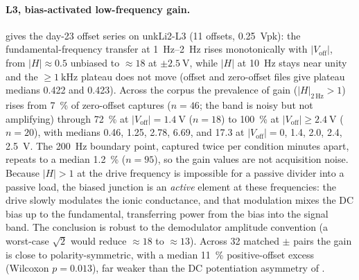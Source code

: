 \paragraph{L3, bias-activated low-frequency gain.}
 gives the day-23 offset series on unkLi2-L3
(\num{11} offsets, \SI{0.25}{Vpk}): the fundamental-frequency transfer at
\SIrange{1}{2}{\hertz} rises monotonically with \(|V_\mathrm{off}|\), from
\(|H|\approx0.5\) unbiased to \(\approx\!18\) at \(\pm\SI{2.5}{\volt}\),
while \(|H|\) at \SI{10}{\hertz} stays near unity and the
\(\geq\!\SI{1}{\kilo\hertz}\) plateau does not move (offset and zero-offset
files give plateau medians \num{0.422} and \num{0.423}). Across the corpus
the prevalence of gain (\(|H|_{2\,\mathrm{Hz}}>1\)) rises from
\SI{7}{\percent} of zero-offset captures (\(n=46\); the band is noisy but
not amplifying) through \SI{72}{\percent} at \(|V_\mathrm{off}|=\SI{1.4}{\volt}\)
(\(n=18\)) to \SI{100}{\percent} at \(|V_\mathrm{off}|\geq\SI{2.4}{\volt}\)
(\(n=20\)), with medians \num{0.46}, \num{1.25}, \num{2.78}, \num{6.69},
and \num{17.3} at \(|V_\mathrm{off}| = 0\), \num{1.4}, \num{2.0}, \num{2.4},
\SI{2.5}{\volt}. The \SI{200}{\hertz} boundary point, captured twice per
condition minutes apart, repeats to a median \SI{1.2}{\percent} (\(n=95\)),
so the gain values are not acquisition noise. Because \(|H|>1\) at the drive
frequency is impossible for a passive divider into a passive load, the biased
junction is an \emph{active} element at these frequencies: the drive slowly
modulates the ionic conductance, and that modulation mixes the DC bias up to
the fundamental, transferring power from the bias into the signal band. The
conclusion is robust to the demodulator amplitude convention (a worst-case
\(\sqrt{2}\) would reduce \(\approx\!18\) to \(\approx\!13\)). Across
\num{32} matched \(\pm\) pairs the gain is close to polarity-symmetric, with
a median \SI{11}{\percent} positive-offset excess (Wilcoxon \(p=0.013\)),
far weaker than the DC potentiation asymmetry of
.


